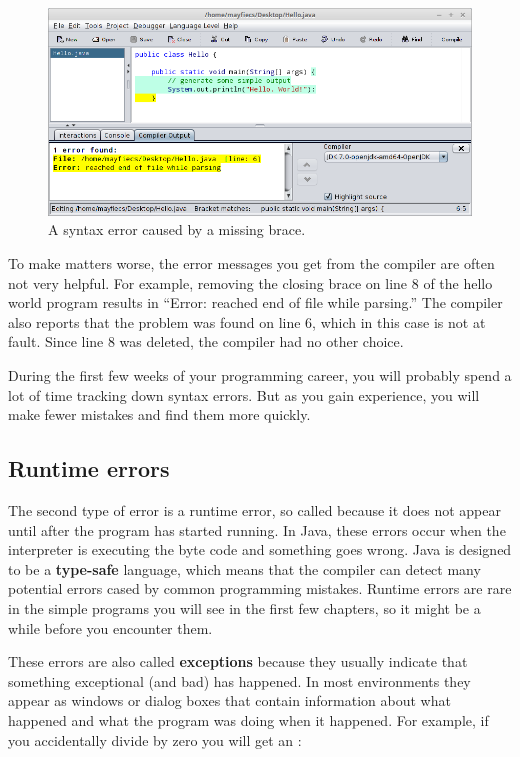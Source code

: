 \begin{figure}[!h]
\includegraphics[width=\textwidth]{syntax-error.png}
\caption{A syntax error caused by a missing brace.}
\end{figure}

To make matters worse, the error messages you get from the compiler are often not very helpful.
For example, removing the closing brace on line 8 of the hello world program results in ``Error: reached end of file while parsing.''
The compiler also reports that the problem was found on line 6, which in this case is not at fault.
Since line 8 was deleted, the compiler had no other choice.

During the first few weeks of your programming career, you will probably spend a lot of time tracking down syntax errors.
But as you gain experience, you will make fewer mistakes and find them more quickly.

\subsection{Runtime errors}


The second type of error is a runtime error, so called because it does not appear until after the program has started running.
In Java, these errors occur when the interpreter is executing the byte code and something goes wrong.
Java is designed to be a {\bf type-safe} language, which means that the compiler can detect many potential errors cased by common programming mistakes.
Runtime errors are rare in the simple programs you will see in the first few chapters, so it might be a while before you encounter them.


These errors are also called {\bf exceptions} because they usually indicate that something exceptional (and bad) has happened.
In most environments they appear as windows or dialog boxes that contain information about what happened and what the program was doing when it happened.
For example, if you accidentally divide by zero you will get an :

